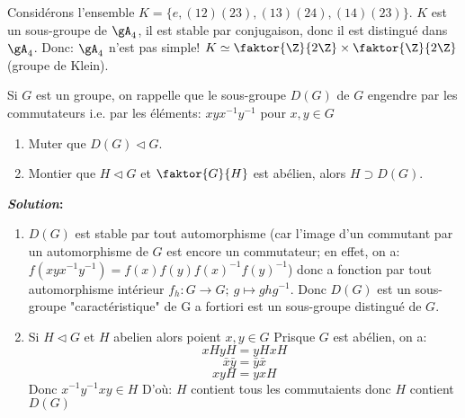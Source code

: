 \begin{exercise}
\begin{enumerate}
	\end{enumerate}


	\begin{remark}
		Considérons l'ensemble $K=\{e, (12)(23), (13)(24), (14)(23)\}$. $K$ est un sous-groupe de $\gA_4$, il est stable par conjugaison, donc il est distingué dans $\gA_4$. Donc: $\gA_4$ n'est pas simple! $K\simeq \faktor{\Z}{2\Z}\times\faktor{\Z}{2\Z}$ (groupe de Klein).
	\end{remark}

\end{exercise}

\begin{exercise}

	Si $G$ est un groupe, on rappelle que le sous-groupe $D(G)$ de $G$ engendre par les commutateurs i.e. par les éléments: $xyx^{-1}y^{-1}$ pour $x,y\in G$

	\begin{enumerate}
		\item Muter que $D(G)\vartriangleleft G$.
		\item Montier que $H\vartriangleleft G$ et $\faktor{G}{H}$ est abélien, alors $H\supset D(G)$.
	\end{enumerate}

	\textbf{\emph{Solution}:}

	\begin{enumerate}
		\item $D(G)$ est stable par tout automorphisme (car l'image d'un commutant par un automorphisme de $G$ est encore un commutateur; en effet, on a:
		$f(xyx^{-1}y^{-1})=f(x)f(y)f(x)^{-1}f(y)^{-1}$)
		donc a fonction par tout automorphisme intérieur $f_h:G\rightarrow G;\ g\mapsto ghg^{-1}$. Donc $D(G)$ est un sous-groupe "caractéristique" de G a fortiori est un sous-groupe distingué de $G$.
		\item Si $H\vartriangleleft G$ et $H$ abelien alors poient $x,y\in G$ Prisque $G$ est abélien, on a:
		$$xH yH=yH xH$$
		$$\bar x \bar y=\bar y\bar x$$
		$$xyH=yxH$$
		Donc $x^{-1}y^{-1}xy\in H$ D'où: $H$ contient tous les commutaients donc $H$ contient $D(G)$
	\end{enumerate}

\end{exercise}
